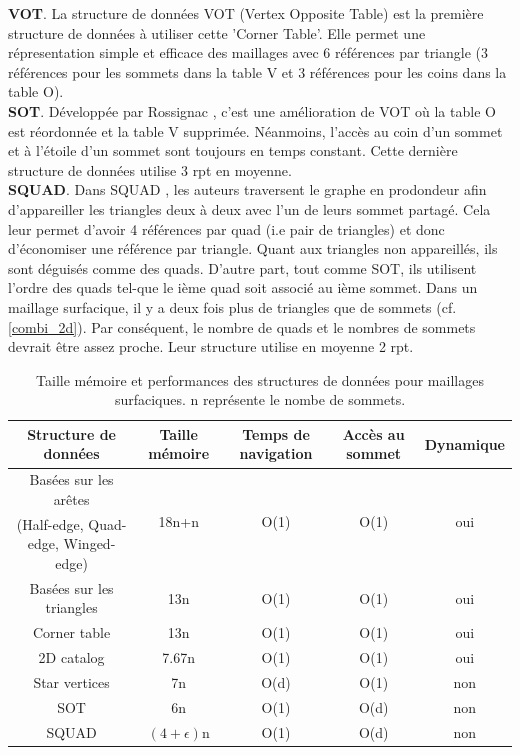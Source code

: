 \noindent\ignorespacesafterend
\textbf{VOT}. La structure de données VOT (Vertex Opposite Table) est la première structure de données à utiliser cette 'Corner Table'. Elle permet une répresentation simple et efficace des maillages avec 6 références par triangle (3 références pour les sommets dans la table V et 3 références pour les coins dans la table O).\\
\textbf{SOT}. Développée par Rossignac \cite{SOT}, c'est une amélioration de VOT où la table O est réordonnée et la table V supprimée. Néanmoins, l'accès au coin d'un sommet et à l'étoile d'un sommet sont toujours en temps constant. Cette dernière structure de données utilise 3 rpt en moyenne.\\
\textbf{SQUAD}. Dans SQUAD \cite{squad}, les auteurs traversent le graphe en prodondeur afin d'appareiller les triangles deux à deux avec l'un de leurs sommet partagé. Cela leur permet d'avoir 4 références par quad (i.e pair de triangles) et donc d'économiser une référence par triangle. Quant aux triangles non appareillés, ils sont déguisés comme des quads. D'autre part, tout comme SOT, ils utilisent l'ordre des quads tel-que le ième quad soit associé au ième sommet. Dans un maillage surfacique, il y a deux fois plus de triangles que de sommets (cf. \ref{combi_2d}). Par conséquent, le nombre de quads et le nombres de sommets devrait être assez proche. Leur structure utilise en moyenne 2 rpt.\\
\begin{table}[th]
\footnotesize
\begin{tabular}{|c | c | c | c | c|}
\hline
Structure de données & Taille mémoire & Temps de navigation & Accès au sommet & Dynamique\\
\hline
Basées sur les arêtes & \multirow{2}{*}{18n+n} & \multirow{2}{*}{O(1)} & \multirow{2}{*}{O(1)} &\multirow{2}{*}{oui}\\
(Half-edge, Quad-edge, Winged-edge)&&&&\\
Basées sur les triangles & 13n & O(1) & O(1) & oui\\		
Corner table & 13n & O(1) & O(1) & oui\\
\hline
2D catalog \cite{2d_catalog}& 7.67n & O(1) & O(1) & oui\\
\hline
Star vertices \cite{star_vertices} & 7n & O(d) & O(1) & non\\		
SOT \cite{SOT}& 6n & O(1) & O(d) & non\\
SQUAD \cite{squad}& $(4+\epsilon)$n & O(1) & O(d) & non\\
\hline  
\end{tabular}
\caption{Taille mémoire et performances des structures de données pour maillages surfaciques. n représente le nombe de sommets.}
\end{table}

